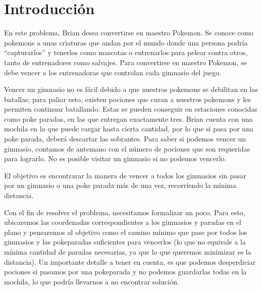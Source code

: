 \section{Introducción}

En este problema, Brian desea convertirse en maestro Pokemon. 
Se conoce como pokemons a unas criaturas que andan por el mundo donde una persona podría ``capturarlos'' y tenerlos como mascotas o entrenarlos para pelear contra otros, tanto de entrenadores como salvajes. 
Para convertirse en maestro Pokemon, se debe vencer a los entrenadoras que controlan cada gimnasio del juego.

Vencer un gimnasio no es fácil debido a que nuestros pokemons se debilitan en las batallas; para paliar esto, existen pociones que curan a nuestros pokemons y les permiten continuar batallando. 
Estas se pueden conseguir en estaciones conocidas como poke paradas, en las que entregan exactamente tres. 
Brian cuenta con una mochila en la que puede cargar hasta cierta cantidad, por lo que si pasa por una poke parada, deberá descartar las sobrantes. 
Para saber si podemos vencer un gimnasio, contamos de antemano con el número de pociones que son requeridas para lograrlo. 
No es posible visitar un gimnasio si no podemos vencerlo.

El objetivo es encontrarar la manera de vencer a todos los gimnasios sin pasar por un gimnasio o una poke parada más de una vez, recorriendo la mínima distancia.

Con el fin de resolver el problema, necesitamos formalizar un poco. Para esto, ubicaremos las coordenadas correspondientes a los gimnasios y paradas en el plano y pensaremos al objetivo como el camino mínimo que pase por todos los gimnasios y las pokeparadas suficientes para vencerlos (lo que no equivale a la mínima cantidad de paradas necesarias, ya que lo que queremos minimizar es la distancia). Un importante detalle a tener en cuenta, es que podemos desperdiciar pociones si pasamos por una pokeparada y no podemos guardarlas todas en la mochila, lo que podría llevarnos a no encontrar solución.

